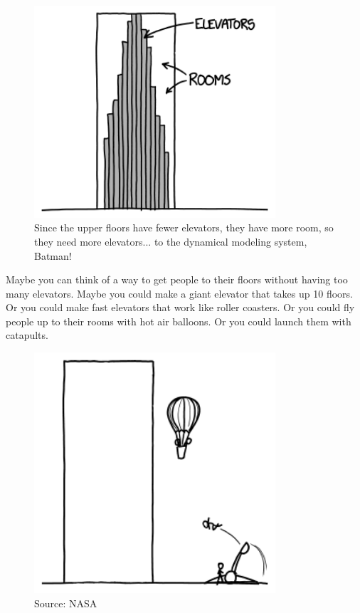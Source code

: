 {\begin{figure}[!htbp]
\centering
\includegraphics[scale=0.5, max width=0.8\textwidth]{imgs/a/94/billion_elevators.png}
\caption{Since the upper floors have fewer elevators, they have more room, so they need more elevators... to the dynamical modeling system, Batman!}
\end{figure}

{Maybe you can think of a way to get people to their floors without having too many elevators. Maybe you could make a giant elevator that takes up 10 floors. Or you could make fast elevators that work like roller coasters. Or you could fly people up to their rooms with hot air balloons. Or you could launch them with catapults.}

\begin{figure}[!htbp]
\centering
\includegraphics[scale=0.5, max width=0.8\textwidth]{imgs/a/94/billion_balloons.png}
\caption{Source: NASA}
\end{figure}

}
